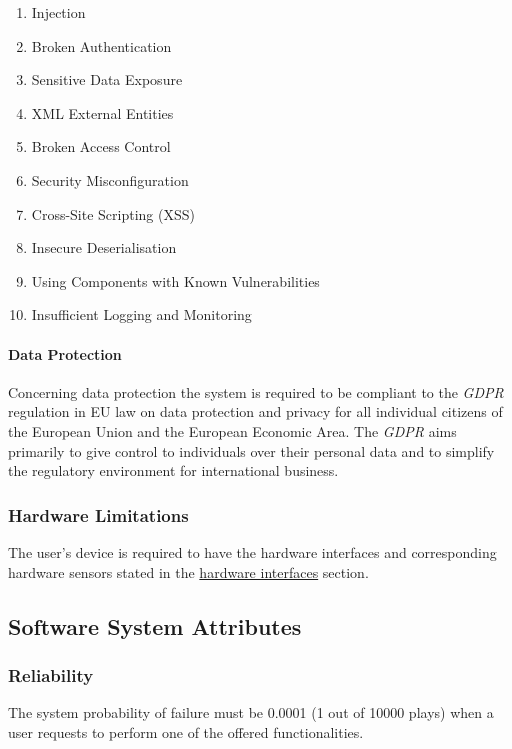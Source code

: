 	\begin{enumerate}[label=\textbf{A\arabic*}]
		\item Injection
		\item Broken Authentication
		\item Sensitive Data Exposure
		\item XML External Entities
		\item Broken Access Control
		\item Security Misconfiguration
		\item Cross-Site Scripting (XSS)
		\item Insecure Deserialisation
		\item Using Components with Known Vulnerabilities
		\item Insufficient Logging and Monitoring
	\end{enumerate}

\paragraph{Data Protection} Concerning data protection the system is required to be compliant to the \emph{GDPR} regulation in EU law on data protection and privacy for all individual citizens of the European Union and the European Economic Area. The \emph{GDPR} aims primarily to give control to individuals over their personal data and to simplify the regulatory environment for international business.

\subsubsection{Hardware Limitations}

	The user's device is required to have the hardware interfaces and corresponding hardware sensors stated in the \hyperref[sec:hardwareinterfaces2]{hardware interfaces} section.
	
\subsection{Software System Attributes}

\subsubsection{Reliability}

	The system probability of failure must be 0.0001 (1 out of 10000 plays) when a user requests to perform one of the offered functionalities. 
	
